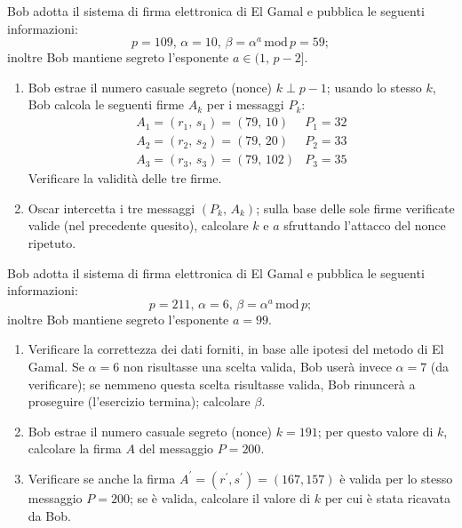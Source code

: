         Bob adotta il sistema di firma elettronica di El Gamal e pubblica le seguenti informazioni: \[
            p=109,\, \alpha = 10,\, \beta = \alpha^a\,\mathrm{mod}\,p=59
        ;\] inoltre Bob mantiene segreto l'esponente $a\in (1,\,p-2]$.
        \begin{enumerate}
            \item Bob estrae il numero casuale segreto (nonce) $k\perp p-1$; usando lo stesso $k$, 
                Bob calcola le seguenti firme $A_k$ per i messaggi $P_k$:
                \[\begin{array}{ll}
                    A_1=(r_1,\,s_1)=(79,\,10) & P_1=32\\
                    A_2=(r_2,\,s_2)=(79,\,20) & P_2=33\\
                    A_3=(r_3,\,s_3)=(79,\,102) & P_3=35
                \end{array}\]
                Verificare la validità delle tre firme.
            \item Oscar intercetta i tre messaggi $(P_k,\,A_k)$; sulla base delle sole firme verificate valide 
                (nel precedente quesito), calcolare $k$ e $a$ sfruttando l'attacco del nonce ripetuto.
        \end{enumerate}

        Bob adotta il sistema di firma elettronica di El Gamal e pubblica le seguenti informazioni: \[
            p=211,\, \alpha = 6,\, \beta = \alpha^a\,\mathrm{mod}\,p
        ;\] inoltre Bob mantiene segreto l'esponente $a=99$.
        \begin{enumerate}
            \item Verificare la correttezza dei dati forniti, in base alle ipotesi del metodo di El Gamal. 
                Se $\alpha=6$ non risultasse una scelta valida, Bob userà invece $\alpha=7$ (da verificare); 
                se nemmeno questa scelta risultasse valida, Bob rinuncerà a proseguire (l'esercizio termina); 
                calcolare $\beta$.
            \item Bob estrae il numero casuale segreto (nonce) $k=191$; per questo valore di $k$, calcolare 
                la firma $A$ del messaggio $P=200$.
            \item Verificare se anche la firma $A^{\prime}=(r^{\prime}, s^{\prime})=(167,157)$ è valida per 
                lo stesso messaggio $P=200$; se è valida, calcolare il valore di $k$ per cui è stata ricavata da Bob.
        \end{enumerate}

